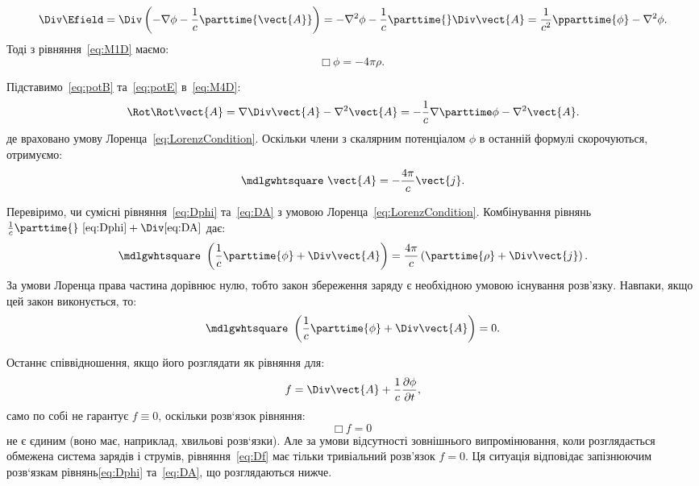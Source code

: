 \begin{equation*}
    \Div\Efield = \Div\left( -\nabla\phi - \frac1c \parttime{\vect{A}}\right) = - \nabla^2\phi - \frac1c \parttime{}\Div\vect{A} =
    \frac1{c^2}\pparttime{\phi} - \nabla^2\phi.
\end{equation*}
Тоді з рівняння~\eqref{eq:M1D} маємо:
\begin{equation}\label{eq:Dphi}
	\mdlgwhtsquare\  \phi = -4\pi \rho.
\end{equation}

Підставимо~\eqref{eq:potB} та~\eqref{eq:potE} в~\eqref{eq:M4D}:
\begin{equation*}
    \Rot\Rot\vect{A} = \nabla \Div\vect{A} - \nabla^2\vect{A} = -\frac1c \nabla \parttime\phi - \nabla^2\vect{A}.
\end{equation*}
де враховано умову Лоренца~\eqref{eq:LorenzCondition}. Оскільки члени з скалярним потенціалом
$\phi$ в останній формулі скорочуються, отримуємо:
\begin{equation}\label{eq:DA}
	\mdlgwhtsquare\  \vect{A} = -\frac{4\pi}{c} \vect{j}.
\end{equation}

Перевіримо, чи сумісні рівняння~\eqref{eq:Dphi} та~\eqref{eq:DA} з умовою Лоренца~\eqref{eq:LorenzCondition}.
Комбінування рівнянь $\frac1c \parttime{}~\eqref{eq:Dphi} + \Div\eqref{eq:DA}$ дає:
\begin{equation}
	\mdlgwhtsquare\ \left( \frac1c \parttime{\phi} + \Div\vect{A} \right) = \frac{4\pi}c \left( \parttime{\rho} + \Div\vect{j}\right)  .
\end{equation}
За умови Лоренца права частина дорівнює нулю, тобто закон збереження
заряду є необхідною умовою існування розв’язку. Навпаки, якщо цей закон
виконується, то:
\begin{equation*}
	\mdlgwhtsquare\ \left( \frac1c \parttime{\phi} + \Div\vect{A} \right) = 0.
\end{equation*}

Останнє співвідношення, якщо його розглядати як рівняння для:
\begin{equation}
	f = \Div \vect{A} + \frac{1}{c} \frac{\partial \phi}{\partial t},
\end{equation}
само по собі не гарантує $f \equiv 0$, оскільки розв`язок
рівняння:
\begin{equation}\label{eq:Df}
	\mdlgwhtsquare\ f = 0
\end{equation}
не є єдиним (воно має, наприклад, хвильові розв`язки). Але за умови
відсутності зовнішнього випромінювання, коли розглядається обмежена
система зарядів і струмів, рівняння~\eqref{eq:Df} має тільки тривіальний розв'язок
$f=0$. Ця ситуація відповідає запізнюючим розв`язкам рівнянь\eqref{eq:Dphi} та~\eqref{eq:DA}, що
розглядаються нижче.


